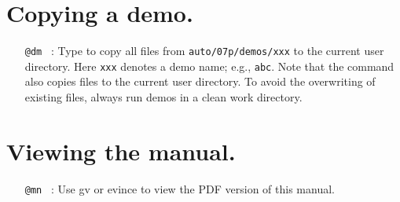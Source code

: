 \documentclass[12pt]{report}
\begin{document}
\section{ Copying a demo.} 

\begin{itemize}

\item[\tt @dm]~:
  Type  
  to copy all files 
  from {\tt auto/07p/demos/xxx}
  to the current user directory.
  Here {\tt xxx} denotes a demo name; e.g., {\tt abc}.
  Note that the  command also copies  files
  to the current user directory. To avoid the overwriting of
  existing files, always run demos in a clean work directory.
\end{itemize}

\section{ Viewing the manual.} 

\begin{itemize}

\item[\tt @mn]~: Use {\cal gv} or {\cal evince} to view the PDF version of this manual.
\end{itemize}

\newpage

\end{document}
